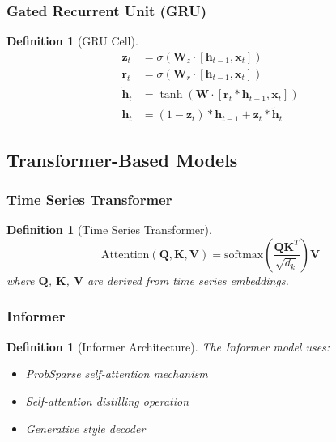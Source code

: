 \documentclass[11pt,a4paper]{article}
\newtheorem{definition}[theorem]{Definition}
\begin{document}
\subsubsection{Gated Recurrent Unit (GRU)}

\begin{definition}[GRU Cell]
\begin{align}
\mathbf{z}_t &= \sigma(\mathbf{W}_z \cdot [\mathbf{h}_{t-1}, \mathbf{x}_t]) \\
\mathbf{r}_t &= \sigma(\mathbf{W}_r \cdot [\mathbf{h}_{t-1}, \mathbf{x}_t]) \\
\tilde{\mathbf{h}}_t &= \tanh(\mathbf{W} \cdot [\mathbf{r}_t * \mathbf{h}_{t-1}, \mathbf{x}_t]) \\
\mathbf{h}_t &= (1 - \mathbf{z}_t) * \mathbf{h}_{t-1} + \mathbf{z}_t * \tilde{\mathbf{h}}_t
\end{align}
\end{definition}

\subsection{Transformer-Based Models}

\subsubsection{Time Series Transformer}

\begin{definition}[Time Series Transformer]
$$\text{Attention}(\mathbf{Q}, \mathbf{K}, \mathbf{V}) = \text{softmax}\left(\frac{\mathbf{Q}\mathbf{K}^T}{\sqrt{d_k}}\right)\mathbf{V}$$
where $\mathbf{Q}$, $\mathbf{K}$, $\mathbf{V}$ are derived from time series embeddings.
\end{definition}

\subsubsection{Informer}

\begin{definition}[Informer Architecture]
The Informer model uses:
\begin{itemize}
\item ProbSparse self-attention mechanism
\item Self-attention distilling operation
\item Generative style decoder
\end{itemize}
\end{definition}
\end{document}
